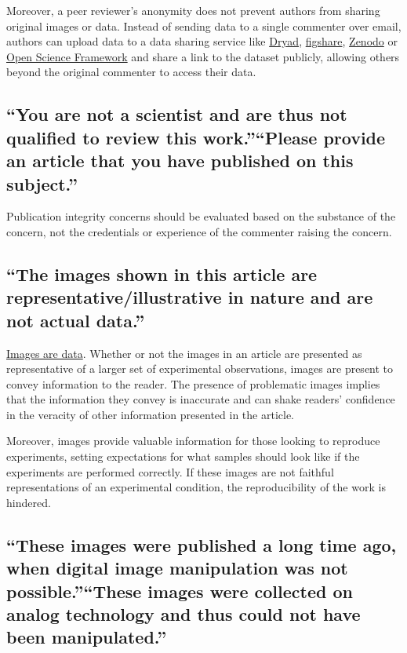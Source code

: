 \documentclass[letterpaper, 12pt]{article}
\begin{document}
Moreover, a peer reviewer's anonymity does not prevent authors from sharing original images or data. Instead of sending data to a single commenter over email, authors can upload data to a data sharing service like \href{https://datadryad.org/stash}{Dryad}, \href{https://figshare.com/}{figshare}, \href{https://zenodo.org/}{Zenodo} or \href{https://osf.io/}{Open Science Framework} and share a link to the dataset publicly, allowing others beyond the original commenter to access their data.

\subsection*{``You are not a scientist and are thus not qualified to review this work.''\newline``Please provide an article that you have published on this subject.''}

Publication integrity concerns should be evaluated based on the substance of the concern, not the credentials or experience of the commenter raising the concern.

\subsection*{``The images shown in this article are representative/illustrative in nature and are not actual data.''}

\href{https://doi.org/10.1007/978-1-62703-056-4_1}{Images are data}. Whether or not the images in an article are presented as representative of a larger set of experimental observations, images are present to convey information to the reader. The presence of problematic images implies that the information they convey is inaccurate and can shake readers' confidence in the veracity of other information presented in the article. 

Moreover, images provide valuable information for those looking to reproduce experiments, setting expectations for what samples should look like if the experiments are performed correctly. If these images are not faithful representations of an experimental condition, the reproducibility of the work is hindered.

\subsection*{``These images were published a long time ago, when digital image manipulation was not possible.''\newline``These images were collected on analog technology and thus could not have been manipulated.''}
\end{document}
